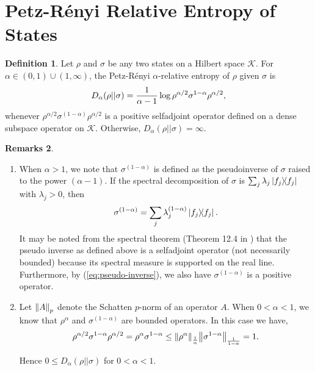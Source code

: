 \documentclass[12pt,a4paper,oneside]{article}
\numberwithin{equation}{section}
\theoremstyle{definition}  %
\newtheorem{defn}{Definition}[section]
\newtheorem{rmks}[defn]{Remarks}
\theoremstyle{plain}  %
\theoremstyle{remark} %
\newcommand{\CK}{\mathcal{K}}
\let\tr\relax
\DeclareMathOperator{\tr}{Tr}
\begin{document}
 \section{Petz-R\'enyi Relative Entropy of States}
 \begin{defn}\label{defn:alpha-relative-entropy}
Let $\rho$ and $\sigma$ be any two states on a Hilbert space $\CK$. For $\alpha \in (0,1)\cup (1,\infty)$, the Petz-R\'enyi $\alpha$-relative entropy of $\rho$ given $\sigma$ is 
\begin{equation}\label{eq:1.1}
  D_{\alpha} (\rho \lvert\lvert \sigma) = \frac{1}{\alpha-1}\log \tr \rho^{\alpha/2}\sigma^{1-\alpha}\rho^{\alpha/2}, 
\end{equation}
whenever $ \rho^{\alpha/2}\sigma^{(1-\alpha)}\rho^{\alpha/2} $ is a positive selfadjoint operator defined on a dense subspace operator on $\CK$. Otherwise, $D_{\alpha} (\rho \lvert\lvert \sigma) =\infty$.
\end{defn}
\begin{rmks}\begin{enumerate}
    \item 
When $\alpha>1$, we note that $\sigma^{(1-\alpha)}$ is defined as the  pseudoinverse of $\sigma$ raised to the power $(\alpha-1)$.  If the spectral decomposition of $\sigma$ is $\sum_{j}\lambda_j\ketbra{f_j}$ with $\lambda_j>0$, then \begin{align}\label{eq:pseudo-inverse}
    \sigma^{(1-\alpha)} = \sum_{j}\lambda_j^{(1-\alpha)}\ketbra{f_j}.
\end{align}
It may be noted from the spectral theorem (Theorem 12.4 in \cite{Par12}) that the pseudo inverse as defined above is a selfadjoint operator (not necessarily bounded) because its spectral measure is supported on the  real line. Furthermore, by (\ref{eq:pseudo-inverse}), we also have $\sigma^{(1-\alpha)}$ is a positive operator.

\item Let $\norm{A}_p$ denote the Schatten $p$-norm of an operator $A$.  When $0<\alpha<1$, we know that $\rho^{\alpha}$ and $\sigma^{(1-\alpha)}$ are bounded operators. In this case we have,
\[ \tr \rho^{\alpha/2}\sigma^{1-\alpha}\rho^{\alpha/2} = \tr \rho^{\alpha}\sigma^{1-\alpha}\\
\leq \norm{\rho^{\alpha}}_{\frac{1}{\alpha}}\norm{\sigma^{1-\alpha}}_{\frac{1}{1-\alpha}}=1.\]

Hence $0\leq D_{\alpha}(\rho||\sigma)$ for $0<\alpha<1$.
\end{enumerate}
\end{rmks}
\end{document}
